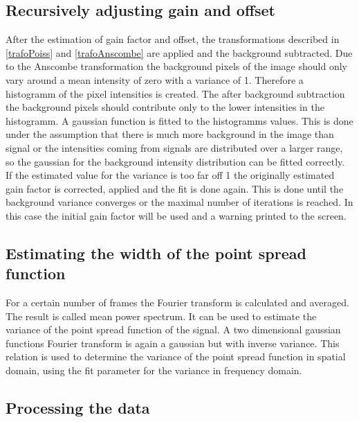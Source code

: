 \subsection{Recursively adjusting gain and offset}
After the estimation of gain factor and offset, the transformations described in \ref{trafoPoiss} and \ref{trafoAnscombe} are applied and the background subtracted.\newline
Due to the Anscombe transformation the background pixels of the image should only vary around a mean intensity of zero with a variance of 1. Therefore a histogramm of the pixel intensities is created. The after background subtraction the background pixels should contribute only to the lower intensities in the histogramm. A gaussian function is fitted to the histogramms values. This is done under the assumption that there is much more background in the image than signal or the intensities coming from signals are distributed over a larger range, so the gaussian for the background intensity distribution can be fitted correctly.\newline
If the estimated value for the variance is too far off 1 the originally estimated gain factor is corrected, applied and the fit is done again. This is done until the background variance converges or the maximal number of iterations is reached. In this case the initial gain factor will be used and a warning printed to the screen.
\subsection{Estimating the width of the point spread function}
For a certain number of frames the Fourier transform is calculated and averaged. The result is called mean power spectrum. It can be used to estimate the variance of the point spread function of the signal. A two dimensional gaussian functions Fourier transform is again a gaussian but with inverse variance. This relation is used to determine the variance of the point spread function in spatial domain, using the fit parameter for the variance in frequency domain.
\subsection{Processing the data}
